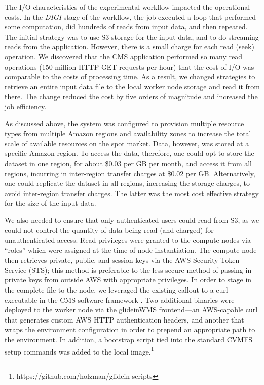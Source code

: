 \documentclass[twocolumn]{svjour3}          %
\begin{document}
The I/O characteristics of the experimental workflow impacted the operational costs. In the {\it DIGI} stage of the workflow,
the job executed a loop that performed some computation, did hundreds of reads from input data, and then repeated. The initial strategy was to use S3 storage for the input data, and to do streaming reads from the
application.
However, there is a small charge for each read (seek) operation. We discovered that the CMS application performed so many read operations (150 million HTTP GET requests per hour) that the cost of I/O was
comparable to the costs of processing time. As a result, we changed strategies to retrieve an entire input data file to the local worker node storage
and read it from there. The change reduced the cost by five orders of magnitude and increased the job efficiency.

As discussed above, the system was configured to provision multiple resource types from multiple Amazon regions and availability zones to increase the total scale of available resources on the spot market. Data, however, was stored at a specific Amazon region. To access the data, therefore, one could opt to store the dataset in one region, for about \$0.03 per GB per month, and access it from all regions, incurring in inter-region transfer charges at \$0.02 per GB. Alternatively, one could replicate the dataset in all regions, increasing the storage charges, to avoid inter-region transfer charges. The latter was the most cost effective strategy for the size of the input data.

We also needed to ensure that only authenticated users could read from S3, as we could not control the quantity of data being read (and charged) for unauthenticated access. Read privileges were granted to the compute nodes via ``roles'' which were assigned at the time
of node instantiation. The compute node then retrieves private, public, and session keys via the AWS Security Token Service (STS); this method is preferable to the less-secure method of passing in private keys from outside AWS with appropriate privileges. In order to stage in the complete file to the node, we leveraged the existing callout to a curl executable in the CMS software framework \cite{CMSSW}.
Two additional binaries were deployed to the worker node via the glideinWMS frontend---an AWS-capable curl that generates custom AWS HTTP authentication headers, and another that wraps the
environment configuration in order to prepend an appropriate path to the environment. In addition, a bootstrap script tied into the standard CVMFS setup commands was added to the local
image.\footnote{https://github.com/holzman/glidein-scripts}
\end{document}
